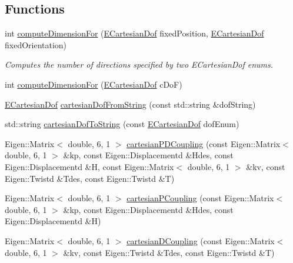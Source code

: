 \subsection*{Functions}
\begin{DoxyCompactItemize}
\item 
int \hyperlink{namespaceocra_1_1utils_abf6a0e8241cd263067cbf1c434952a01}{compute\+Dimension\+For} (\hyperlink{namespaceocra_a436781c7059a0f76027df1c652126260}{E\+Cartesian\+Dof} fixed\+Position, \hyperlink{namespaceocra_a436781c7059a0f76027df1c652126260}{E\+Cartesian\+Dof} fixed\+Orientation)
\begin{DoxyCompactList}\small\item\em Computes the number of directions specified by two E\+Cartesian\+Dof enums. \end{DoxyCompactList}\item 
int \hyperlink{namespaceocra_1_1utils_a27a97693df87c348850488eb7aeed12a}{compute\+Dimension\+For} (\hyperlink{namespaceocra_a436781c7059a0f76027df1c652126260}{E\+Cartesian\+Dof} c\+DoF)
\item 
\hyperlink{namespaceocra_a436781c7059a0f76027df1c652126260}{E\+Cartesian\+Dof} \hyperlink{namespaceocra_1_1utils_acfe425f7bacb0a3c69e868e7f368d99c}{cartesian\+Dof\+From\+String} (const std\+::string \&dof\+String)
\item 
std\+::string \hyperlink{namespaceocra_1_1utils_a5e098489ff3bc369635762ab1a208b0e}{cartesian\+Dof\+To\+String} (const \hyperlink{namespaceocra_a436781c7059a0f76027df1c652126260}{E\+Cartesian\+Dof} dof\+Enum)
\item 
Eigen\+::\+Matrix$<$ double, 6, 1 $>$ \hyperlink{namespaceocra_1_1utils_a2253567d0df64a629bad3bdb7e2bd30b}{cartesian\+P\+D\+Coupling} (const Eigen\+::\+Matrix$<$ double, 6, 1 $>$ \&kp, const Eigen\+::\+Displacementd \&Hdes, const Eigen\+::\+Displacementd \&H, const Eigen\+::\+Matrix$<$ double, 6, 1 $>$ \&kv, const Eigen\+::\+Twistd \&Tdes, const Eigen\+::\+Twistd \&T)
\item 
Eigen\+::\+Matrix$<$ double, 6, 1 $>$ \hyperlink{namespaceocra_1_1utils_aef5a7c74e8cfa9b803cd2a18d6401d1d}{cartesian\+P\+Coupling} (const Eigen\+::\+Matrix$<$ double, 6, 1 $>$ \&kp, const Eigen\+::\+Displacementd \&Hdes, const Eigen\+::\+Displacementd \&H)
\item 
Eigen\+::\+Matrix$<$ double, 6, 1 $>$ \hyperlink{namespaceocra_1_1utils_aea2b40d346ee7532a6cdb9392e7c5767}{cartesian\+D\+Coupling} (const Eigen\+::\+Matrix$<$ double, 6, 1 $>$ \&kv, const Eigen\+::\+Twistd \&Tdes, const Eigen\+::\+Twistd \&T)

\end{DoxyCompactItemize}
